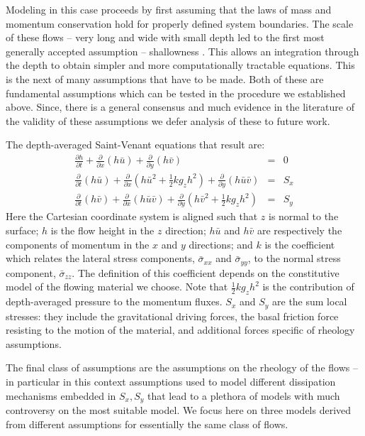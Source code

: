 \documentclass{article}
\begin{document}
Modeling in this case proceeds by first assuming that the laws of mass and momentum conservation hold for properly defined system boundaries. The scale of these flows -- very long and wide with small depth led to the first most generally accepted assumption -- shallowness \citep{SavageHutter1989}. This allows an integration through the depth to obtain simpler and more computationally tractable equations. This is the next of many assumptions that have to be made. Both of these are fundamental assumptions which can be tested in the procedure we established above. Since, there is a general consensus and much evidence in the literature of the validity of these assumptions we defer analysis of these to future work.

The depth-averaged Saint-Venant equations that result are:
\begin{eqnarray}
\label{eq:D_A}
\frac{\partial h}{\partial t} +
\frac{\partial}{\partial x}(h \bar{u}) +
\frac{\partial}{\partial y}(h\bar{v}) &=& 0 \nonumber \\
\frac{\partial}{\partial t} (h\bar{u}) +
\frac{\partial}{\partial x}\left(h\bar{u}^2 + \frac{1}{2}k g_{z}h^2\right) + \frac{\partial}{\partial y}(h\bar{u}\bar{v}) &=& S_{x}\\
\frac{\partial}{\partial t} (h\bar{v}) +
\frac{\partial}{\partial x}(h\bar{u}\bar{v}) +
\frac{\partial}{\partial y}\left(h\bar{v}^2 + \frac{1}{2}k g_{z}h^2\right) &=& S_{y} \nonumber
\end{eqnarray}
Here the Cartesian coordinate system is aligned such that $z$ is normal to the surface; $h$ is the flow height in the $z$ direction; $h\bar{u}$ and $h\bar{v}$ are respectively the components of momentum in the $x$ and $y$ directions; and $k$ is the coefficient which relates the lateral stress components, $\bar{\sigma}_{xx}$ and $\bar{\sigma}_{yy}$, to the normal stress component, $\bar{\sigma}_{zz}$. The definition of this coefficient depends on the constitutive model of the flowing material we choose. Note that $\frac{1}{2} k g_z h^2$ is the contribution of depth-averaged pressure to the momentum fluxes. $S_x$ and $S_y$ are the sum local stresses: they include the gravitational driving forces, the basal friction force resisting to the motion of the material, and additional forces specific of rheology assumptions.

The final class of assumptions are the assumptions on the rheology of the flows -- in particular in this context assumptions used to model different dissipation mechanisms embedded in $S_x, S_y$ that lead to a plethora of models with much controversy on the most suitable model. We focus here on three models derived from different assumptions for essentially the same class of flows.
\end{document}

